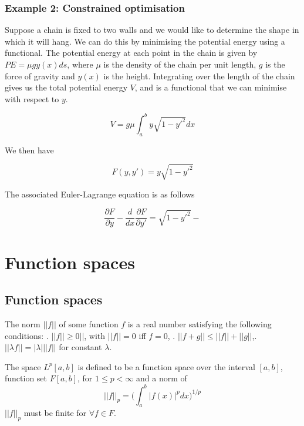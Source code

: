 \documentclass[]{article}
\begin{document}
\subsubsection{Example 2: Constrained optimisation}
Suppose a chain is fixed to two walls and we would like to determine the shape in which it will hang. We can do this by minimising the potential energy using a functional. The potential energy at each point in the chain is given by $PE = \mu gy(x) ds$, where $\mu$ is the density of the chain per unit length, $g$ is the force of gravity and $y(x)$ is the height. Integrating over the length of the chain gives us the total potential energy $V$, and is a functional that we can minimise with respect to $y$.

\begin{equation} V = g \mu \int_{a}^{b} y\sqrt{1-y'^{2}}dx \end{equation}

We then have

\begin{equation} F(y, y') = y\sqrt{1-y'^{2}}\end{equation}

The associated Euler-Lagrange equation is as follows

\begin{equation} \frac{\partial F}{\partial y} - \frac{d}{dx}\frac{\partial F}{\partial y'} = \sqrt{1-y'^{2}} -  \end{equation}


\nocite{*}



\newpage
\section{Function spaces}

\subsection{Function spaces}
The norm $||f||$ of some function $f$ is a real number satisfying the following conditions:
\newline
{}. $||f|| \geq 0||$, with $||f|| = 0$ iff $f=0$, . $||f+g|| \leq ||f|| + ||g||$,. $||\lambda f|| = |\lambda|||f||$ for constant $\lambda$.

The space $L^{p}[a,b]$ is defined to be a function space over the interval $[a,b]$, function set $F[a,b]$, for $1 \leq p < \infty$ and a norm of
\begin{equation} ||f||_{p} = \bigg( \int_{a}^{b} |f(x)|^{p}dx  \bigg)^{1/p} \end{equation}
$||f||_{p}$ must be finite for $\forall f \in F$.
\end{document}
